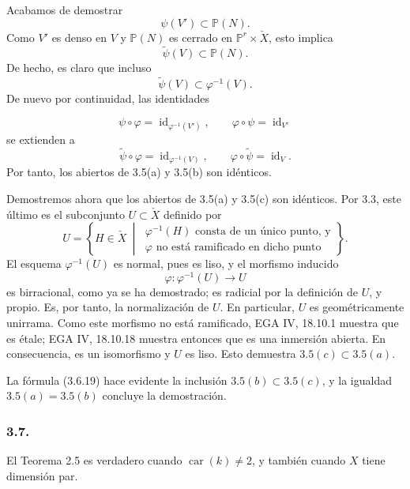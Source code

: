 Acabamos de demostrar
\begin{equation}\tag{3.6.16}
\psi(V')\subset\mathbb P(N).
\end{equation}
Como $V'$ es denso en $V$ y $\mathbb P(N)$ es cerrado en
$\mathbb P^r\times\check X$, esto implica
\begin{equation}\tag{3.6.17}
\widetilde\psi(V)\subset\mathbb P(N).
\end{equation}
De hecho, es claro que incluso
\begin{equation}\tag{3.6.18}
\widetilde\psi(V)\subset\varphi^{-1}(V).
\end{equation}
De nuevo por continuidad, las identidades

\pageoriginale

\[
\psi\circ\varphi=\operatorname{id}_{\varphi^{-1}(V')},
\qquad
\varphi\circ\psi=\operatorname{id}_{V'}
\]
se extienden a
\[
\widetilde\psi\circ\varphi=\operatorname{id}_{\varphi^{-1}(V)},
\qquad
\varphi\circ\widetilde\psi=\operatorname{id}_{V}.
\]
Por tanto, los abiertos de 3.5(a) y 3.5(b) son idénticos.

Demostremos ahora que los abiertos de 3.5(a) y 3.5(c) son idénticos.
Por 3.3, este último es el subconjunto $U\subset\check X$ definido por
\begin{equation}\tag{3.6.19}
U=\left\{H\in\check X\ \middle|\
\begin{array}{l}
\varphi^{-1}(H)\text{ consta de un único punto, y}\\
\varphi\text{ no está ramificado en dicho punto}
\end{array}
\right\}.
\end{equation}
El esquema $\varphi^{-1}(U)$ es normal, pues es liso, y el morfismo
inducido
\[
\varphi:\varphi^{-1}(U)\longrightarrow U
\]
es birracional, como ya se ha demostrado; es radicial por la
definición de $U$, y propio. Es, por tanto, la normalización de $U$.
En particular, $U$ es geométricamente unirrama. Como este morfismo
no está ramificado, EGA IV, 18.10.1 muestra que es étale; EGA IV,
18.10.18 muestra entonces que es una inmersión abierta. En
consecuencia, es un isomorfismo y $U$ es liso. Esto demuestra
$3.5(c)\subset3.5(a)$.

\pageoriginale

La fórmula (3.6.19) hace evidente la inclusión
$3.5(b)\subset3.5(c)$, y la igualdad
$3.5(a)=3.5(b)$ concluye la demostración.

\subsubsection*{3.7.}
El Teorema 2.5 es verdadero cuando $\operatorname{car}(k)\ne2$, y
también cuando $X$ tiene dimensión par.

